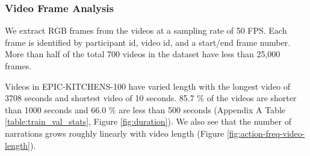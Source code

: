 
\subsubsection{Video Frame Analysis}
We extract RGB frames from the videos at a sampling rate of 50 FPS. Each frame is identified by participant id, video id, and a start/end frame number. More than half of the total 700 videos in the dataset have less than 25,000 frames.  

Videos in EPIC-KITCHENS-100 have varied length with the longest video of 3708 seconds and shortest video of 10 seconds. 85.7 $\%$ of the videos are shorter than 1000 seconds and 66.0 $\%$ are less than 500 seconds (Appendix A Table \ref{table:train_val_stats}, Figure \ref{fig:duration}). 
We also see that the number of narrations grows roughly linearly with video length (Figure \ref{fig:action-freq-video-length}).  

